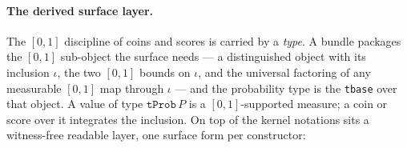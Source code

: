 \paragraph{The derived surface layer.}
The $[0,1]$ discipline of coins and scores is carried by a
\emph{type}. A bundle  packages the
$[0,1]$ sub-object the surface needs --- a distinguished object with
its inclusion $\iota$, the two $[0,1]$ bounds on $\iota$, and the
universal factoring  of any
measurable $[0,1]$ map through $\iota$ --- and the probability type
 is the \texttt{tbase} over that
object. A value of type $\mathtt{tProb}\,P$ is a $[0,1]$-supported
measure; a coin or score over it integrates the inclusion. On top of
the kernel notations sits a witness-free readable layer, one surface
form per constructor:
